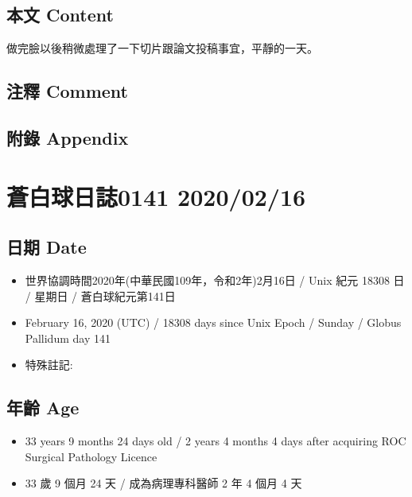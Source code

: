 \documentclass[
]{article}
\providecommand{\tightlist}{%
  \setlength{\itemsep}{0pt}\setlength{\parskip}{0pt}}
\begin{document}
\hypertarget{ux672cux6587-content-76}{%
\subsection{本文 Content}\label{ux672cux6587-content-76}}

做完臉以後稍微處理了一下切片跟論文投稿事宜，平靜的一天。

\hypertarget{ux6ce8ux91cb-comment-75}{%
\subsection{注釋 Comment}\label{ux6ce8ux91cb-comment-75}}

\hypertarget{ux9644ux9304-appendix-76}{%
\subsection{附錄 Appendix}\label{ux9644ux9304-appendix-76}}

\hypertarget{ux84bcux767dux7403ux65e5ux8a8c0141-20200216}{%
\section{蒼白球日誌0141
2020/02/16}\label{ux84bcux767dux7403ux65e5ux8a8c0141-20200216}}

\hypertarget{ux65e5ux671f-date-77}{%
\subsection{日期 Date}\label{ux65e5ux671f-date-77}}

\begin{itemize}
\tightlist
\item
  世界協調時間2020年(中華民國109年，令和2年)2月16日 / Unix 紀元 18308 日
  / 星期日 / 蒼白球紀元第141日
\item
  February 16, 2020 (UTC) / 18308 days since Unix Epoch / Sunday /
  Globus Pallidum day 141
\item
  特殊註記:
\end{itemize}

\hypertarget{ux5e74ux9f61-age-77}{%
\subsection{年齡 Age}\label{ux5e74ux9f61-age-77}}

\begin{itemize}
\tightlist
\item
  33 years 9 months 24 days old / 2 years 4 months 4 days after
  acquiring ROC Surgical Pathology Licence
\item
  33 歲 9 個月 24 天 / 成為病理專科醫師 2 年 4 個月 4 天
\end{itemize}
\end{document}
